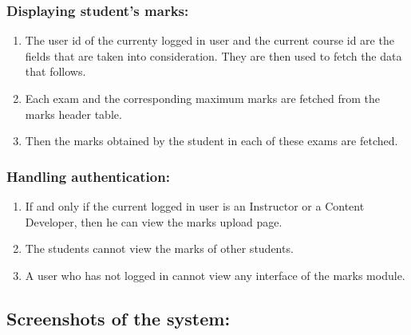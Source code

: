 \subsubsection*{Displaying student's marks:}
\begin{enumerate}
	\item The user id of the currenty logged in user and the current course id are the fields that are taken into consideration. They are then used to fetch the data that follows.
	\item Each exam and the corresponding maximum marks are fetched from the marks header table.
	\item Then the marks obtained by the student in each of these exams are fetched.
\end{enumerate}

\subsubsection*{Handling authentication:}
\begin{enumerate}
	\item If and only if the current logged in user is an Instructor or a Content Developer, then he can view the marks upload page.
	\item The students cannot view the marks of other students.
	\item A user who has not logged in cannot view any interface of the marks module.
\end{enumerate}

\subsection*{Screenshots of the system:}

